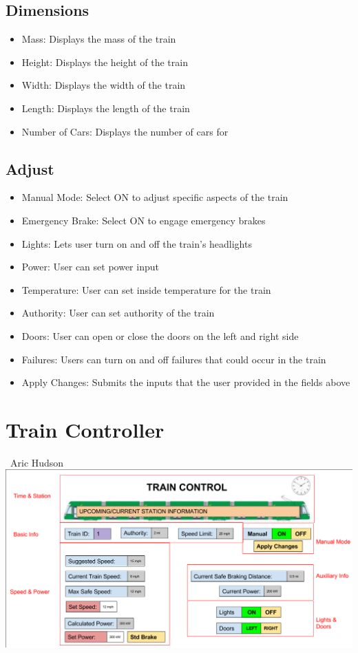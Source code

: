 \documentclass{scrreprt}
\begin{document}
\section{Dimensions}
\begin{itemize}
    \item Mass: Displays the mass of the train
    \item Height: Displays the height of the train
    \item Width: Displays the width of the train
    \item Length: Displays the length of the train
    \item Number of Cars: Displays the number of cars for
\end{itemize}

\section{Adjust}

\begin{itemize}
    \item Manual Mode: Select ON to adjust specific aspects of the train
    \item Emergency Brake: Select ON to engage emergency brakes
    \item Lights: Lets user turn on and off the train's headlights
    \item Power: User can set power input
    \item Temperature: User can set inside temperature for the train
    \item Authority: User can set authority of the train
    \item Doors: User can open or close the doors on the left and right side
    \item Failures: Users can turn on and off failures that could occur in the train
    \item Apply Changes: Submits the inputs that the user provided in the fields above
    \end{itemize}


\chapter{Train Controller}\
\Large{Aric Hudson}\\
\includegraphics[width=\textwidth]{tc}
\end{document}
